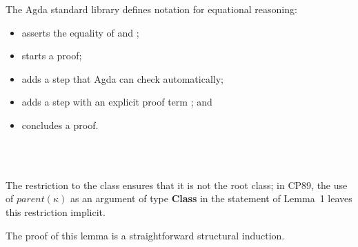 \begin{AgdaAlign}
The Agda standard library defines notation for equational reasoning:
\begin{itemize}
\item {} asserts the equality of  and ;
\item {} starts a proof;
\item {} adds a step that Agda can check automatically;
\item {} adds a step with an explicit proof term ;
and
\item {} concludes a proof.
\end{itemize}

\begin{code}%
%
\>[4]\AgdaSpace{}%
\AgdaSymbol{:}\AgdaSpace{}%
\AgdaSpace{}%
\AgdaSpace{}%
\AgdaSpace{}%
\AgdaSpace{}%
\AgdaSpace{}%
\AgdaSpace{}%
\<%
\\
\>[4][@{}l@{\AgdaIndent{0}}]%
\>[6]\AgdaSpace{}%
\AgdaSymbol{(}\AgdaSpace{}%
\AgdaSymbol{)}\AgdaSpace{}%
\AgdaSpace{}%
\AgdaSpace{}%
\AgdaSpace{}%
\AgdaSpace{}%
\AgdaSymbol{(}\AgdaSpace{}%
\AgdaSpace{}%
\AgdaSymbol{)}\AgdaSpace{}%
\<%
\\
%
\>[6]\AgdaSpace{}%
\AgdaSpace{}%
\AgdaSpace{}%
\AgdaSymbol{(}\AgdaSpace{}%
\AgdaSpace{}%
\AgdaSymbol{)}\AgdaSpace{}%
\AgdaSymbol{(}\AgdaSpace{}%
\AgdaSymbol{(}\AgdaSpace{}%
\AgdaSymbol{)}\AgdaSpace{}%
\AgdaSpace{}%
\AgdaSymbol{)}\<%
\end{code}
%
The restriction to the class  ensures that it is not the root class;
in CP89, the use of $\textit{parent}(κ)$ as an argument of type \textbf{Class}
in the statement of Lemma~1 leaves this restriction implicit.

The proof of this lemma is a straightforward structural induction.


\end{AgdaAlign}
